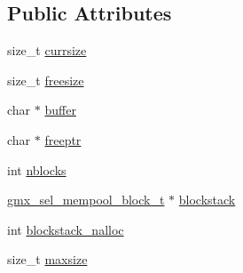 \subsection*{\-Public \-Attributes}
\begin{DoxyCompactItemize}
\item 
size\-\_\-t \hyperlink{structgmx__sel__mempool__t_aa4ec11d1773fc6a2e1ed058acda53d2b}{currsize}
\item 
size\-\_\-t \hyperlink{structgmx__sel__mempool__t_ae7354978f237cc4f1051e0099180e624}{freesize}
\item 
char $\ast$ \hyperlink{structgmx__sel__mempool__t_a27639e0126ed758352f20b27e9db9507}{buffer}
\item 
char $\ast$ \hyperlink{structgmx__sel__mempool__t_a2b7446cad910e6e6728dc2b169842a2c}{freeptr}
\item 
int \hyperlink{structgmx__sel__mempool__t_a78230677072396ef32529353b2fe2455}{nblocks}
\item 
\hyperlink{structgmx__sel__mempool__block__t}{gmx\-\_\-sel\-\_\-mempool\-\_\-block\-\_\-t} $\ast$ \hyperlink{structgmx__sel__mempool__t_ad882f9008c8a1f9c951e169f9dc4dbbb}{blockstack}
\item 
int \hyperlink{structgmx__sel__mempool__t_a2d42d0834a8b1c47c5e6a2e5a202faa5}{blockstack\-\_\-nalloc}
\item 
size\-\_\-t \hyperlink{structgmx__sel__mempool__t_a3f597a89db451db3f0bd5c3f5b393ffe}{maxsize}
\end{DoxyCompactItemize}


